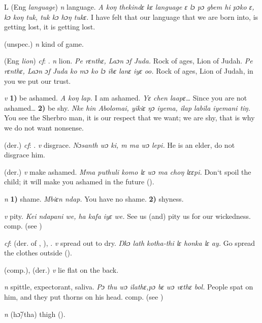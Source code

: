 \begin{letter}{L}
 (Eng \textit{language}) \textit{n} language. \textit{A koŋ thekindɛ kɛ language ɛ lɔ pɔ gbem hi pɔko ɛ, kɔ koŋ tuk, tuk kɔ hɔŋ tukɛ.} I have felt that our language that we are born into, is getting lost, it is getting lost.

 (unspec.) \textit{n} kind of game.

 (Eng \textit{lion}) \textit{cf}: . \textit{n} lion. \textit{Pe rɛnthɛ, Laɔn ɔf Juda.} Rock of ages, Lion of Judah. \textit{Pe rɛnthɛ, Laɔn ɔf Juda ko mɔ ko lɔ ibɛ lanɛ iyɛ oo.} Rock of ages, Lion of Judah, in you we put our trust.

 \textit{v} \textbf{1)} be ashamed. \textit{A koŋ lap.} I am ashamed. \textit{Yɛ chen laapɛ…} Since you are not ashamed… \textbf{2)} be shy. \textit{Nke hin Abolomai, yikiɛ ŋɔ iyema, ilap labila iyemani tiŋ.} You see the Sherbro man, it is our respect that we want; we are shy, that is why we do not want nonsense.

 (der.) \textit{cf}: . \textit{v} disgrace.\textit{ Nɔsanth wɔ ki, m ma wɔ lepi.} He is an elder, do not disgrace him.

 (der.) \textit{v} make ashamed. \textit{Mma puthuli komo lɛ wɔ ma choŋ lɛɛpi.} Don‘t spoil the child; it will make you ashamed in the future (\citealt{Pichl1967}). 

 \textit{n} \textbf{1)} shame. \textit{Mbiɛn ndap.} You have no shame. \textbf{2)} shyness.

 \textit{v} pity. \textit{Kei ndapani we, ha kafa iyɛ we.} See us (and) pity us for our wickedness. comp.  (see ) 

 \textit{cf}:  (der. of , ), . \textit{v} spread out to dry. \textit{Ŋkɔ lath kotha-thi lɛ honka lɛ ay.} Go spread the clothes outside (\citealt{Pichl1967}). 

 (comp.), (der.) \textit{v} lie flat on the back.

 \textit{n} spittle, expectorant, saliva. \textit{Pɔ thu wɔ ilathɛ,pɔ bɛ wɔ vɛthɛ bol.} People spat on him, and they put thorns on his head. comp.  (see ) 



 \textit{n} (hɔ̃/tha) thigh (\citealt{Pichl1967}). 


\end{letter}
